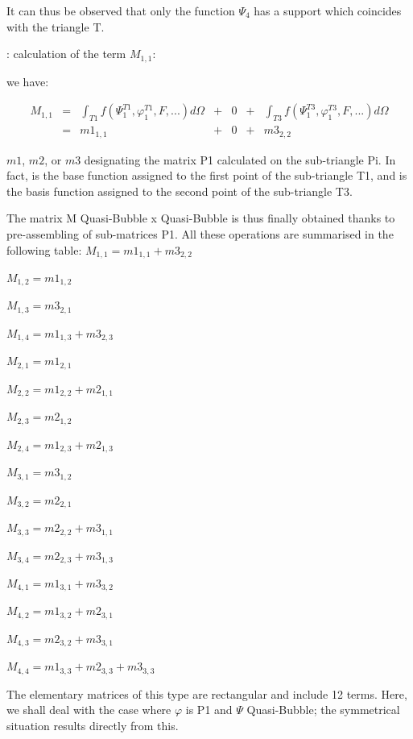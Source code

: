 It can thus be observed that only the function $\Psi _{4}$ has a support which
coincides with the triangle T.

: calculation of the term ${M}_{1,1}$:

we have:

\[
\begin{array}{ccccccc}
M_{1,1} & = & \int _{T1}f(\Psi _{1}^{T1} ,\varphi _{1}^{T1} ,F,...)d\Omega & + & 0 & + & \int _{T3}f(\Psi _{1}^{T3} ,\varphi _{1}^{T3} ,F,...)d\Omega \\
& = &            m1_{1,1}                                                  & + & 0 & + & m3_{2,2}
\end{array}
\]

$m1$, $m2$, or $m3$ designating the matrix P1 calculated on the sub-triangle Pi. In
fact,  is the base function assigned to the first point of the sub-triangle T1,
and  is the basis function assigned to the second point of the sub-triangle T3.

The matrix M Quasi-Bubble x Quasi-Bubble is thus finally obtained thanks to
pre-assembling of sub-matrices P1. All these operations are summarised in the
following table:
$M_{1,1} = m1_{1,1} + m3_{2,2}$

$M_{1,2} = m1_{1,2}$

$M_{1,3} = m3_{2,1}$

$M_{1,4} = m1_{1,3} + m3_{2,3}$

$M_{2,1} = m1_{2,1}$

$M_{2,2} = m1_{2,2} + m2_{1,1}$

$M_{2,3} = m2_{1,2}$

$M_{2,4} = m1_{2,3} + m2_{1,3}$

$M_{3,1} = m3_{1,2}$

$M_{3,2} = m2_{2,1}$

$M_{3,3} = m2_{2,2} + m3_{1,1}$

$M_{3,4} = m2_{2,3} + m3_{1,3}$

$M_{4,1} = m1_{3,1} + m3_{3,2}$

$M_{4,2} = m1_{3,2} + m2_{3,1}$

$M_{4,3} = m2_{3,2} + m3_{3,1}$

$M_{4,4} = m1_{3,3} + m2_{3,3} + m3_{3,3}$


The elementary matrices of this type are rectangular and include 12 terms.
Here, we shall deal with the case where $\varphi$ is P1 and $\Psi$
Quasi-Bubble; the symmetrical situation results directly from this.

